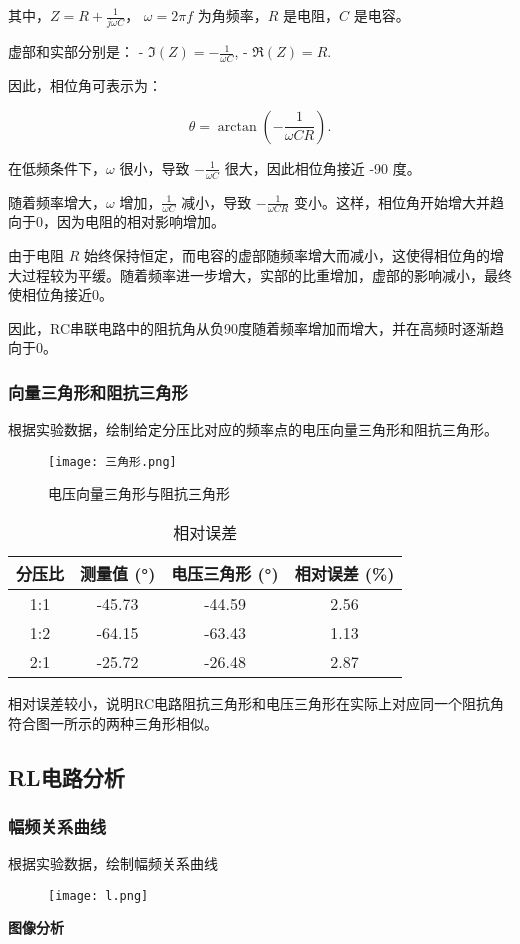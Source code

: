 \documentclass[dvipsnames, svgnames,a4paper,11pt]{article}
\begin{document}
其中，\(Z = R + \frac{1}{j\omega C}\)，
\( \omega = 2\pi f \) 为角频率，\(R\) 是电阻，\(C\) 是电容。

虚部和实部分别是：
- \(\Im(Z) = -\frac{1}{\omega C}\),
- \(\Re(Z) = R\).

因此，相位角可表示为：

\[
\theta = \arctan\left( -\frac{1}{\omega C R} \right).
\]

在低频条件下，\( \omega \) 很小，导致 \(-\frac{1}{\omega C}\) 很大，因此相位角接近 -90 度。

随着频率增大，\(\omega\) 增加，\(\frac{1}{\omega C}\) 减小，导致 \(-\frac{1}{\omega C R}\) 变小。这样，相位角开始增大并趋向于0，因为电阻的相对影响增加。

由于电阻 \(R\) 始终保持恒定，而电容的虚部随频率增大而减小，这使得相位角的增大过程较为平缓。随着频率进一步增大，实部的比重增加，虚部的影响减小，最终使相位角接近0。

因此，RC串联电路中的阻抗角从负90度随着频率增加而增大，并在高频时逐渐趋向于0。
\clearpage
\subsubsection{向量三角形和阻抗三角形}
根据实验数据，绘制给定分压比对应的频率点的电压向量三角形和阻抗三角形。
\begin{figure}[{H}]
	\centering
	\texttt{[image: 三角形.png]}
	\caption{电压向量三角形与阻抗三角形}
	\label{}
\end{figure}

\begin{table}[H]
    \centering
    \begin{tabular}{|c|c|c|c|}
        \hline
        分压比 & 测量值 (°) & 电压三角形 (°) & 相对误差 (\%) \\
        \hline
        1:1   & -45.73     & -44.59         & 2.56 \\
        1:2   & -64.15     & -63.43         & 1.13 \\
        2:1   & -25.72     & -26.48         &  2.87 \\
        \hline
    \end{tabular}
    \caption{相对误差}
\end{table}
相对误差较小，说明RC电路阻抗三角形和电压三角形在实际上对应同一个阻抗角符合图一所示的两种三角形相似。
\clearpage
\subsection{RL电路分析}
\subsubsection{幅频关系曲线}
根据实验数据，绘制幅频关系曲线
\begin{figure}[{H}]
	\centering
	\texttt{[image: l.png]}
	
	\label{}
\end{figure}
\textbf{图像分析}
\end{document}
